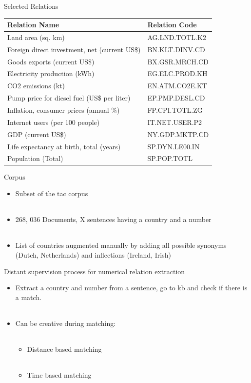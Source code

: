 \documentclass{beamer}
\begin{document}
\begin{frame}{Selected Relations}
 \begin{center}
\begin{tabular}{|l|l|}
\hline
Relation Name & Relation Code \\
\hline
Land area (sq. km)&AG.LND.TOTL.K2\\
Foreign direct investment, net (current US\$)&BN.KLT.DINV.CD\\
Goods exports (current US\$)&BX.GSR.MRCH.CD\\
Electricity production (kWh)&EG.ELC.PROD.KH\\
CO2 emissions (kt)&EN.ATM.CO2E.KT\\
Pump price for diesel fuel (US\$ per liter)&EP.PMP.DESL.CD\\
Inflation, consumer prices (annual \%)&FP.CPI.TOTL.ZG\\
Internet users (per 100 people)&IT.NET.USER.P2\\
GDP (current US\$)&NY.GDP.MKTP.CD\\
Life expectancy at birth, total (years)&SP.DYN.LE00.IN\\
Population (Total)&SP.POP.TOTL\\
\hline
\end{tabular}
\end{center}

\end{frame}
\begin{frame}{Corpus}
\begin{itemize}
 \item Subset of the tac corpus \\~\\
 \item 268, 036 Documents, X sentences having a country and a number  \\~\\
 \item List of countries augmented manually by adding all possible synonyms (Dutch, Netherlands) and inflections (Ireland, Irish)
\end{itemize}

 
\end{frame}
\begin{frame}{Distant supervision process for numerical relation extraction}
 \begin{itemize}
  \item Extract a country and number from a sentence, go to kb and check if there is a match. \\~\\
  \item Can be creative during matching: \\~\\
  \begin{itemize} 
   \item Distance based matching \\~\\
   \item Time based matching 
  \end{itemize}
 \end{itemize}
\end{frame}
\end{document}

